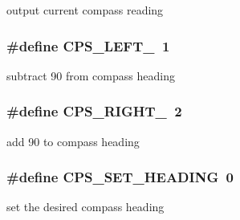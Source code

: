 output current compass reading \hypertarget{group__compass__commands_gab51c4d4e21701c7cd0230a24c2ab74be}{
\subsubsection[{C\-P\-S\-\_\-\-L\-E\-F\-T\-\_\-90}]{\setlength{\rightskip}{0pt plus 5cm}\#define C\-P\-S\-\_\-\-L\-E\-F\-T\-\_~1}}\label{group__compass__commands_gab51c4d4e21701c7cd0230a24c2ab74be}
subtract 90 from compass heading \hypertarget{group__compass__commands_ga53ccdcb9ce75af6b95e56476367d2875}{
\subsubsection[{C\-P\-S\-\_\-\-R\-I\-G\-H\-T\-\_\-90}]{\setlength{\rightskip}{0pt plus 5cm}\#define C\-P\-S\-\_\-\-R\-I\-G\-H\-T\-\_~2}}\label{group__compass__commands_ga53ccdcb9ce75af6b95e56476367d2875}
add 90 to compass heading \hypertarget{group__compass__commands_ga10dbf50964cb04b6648e3b65502c0ff4}{
\subsubsection[{C\-P\-S\-\_\-\-S\-E\-T\-\_\-\-H\-E\-A\-D\-I\-N\-G}]{\setlength{\rightskip}{0pt plus 5cm}\#define C\-P\-S\-\_\-\-S\-E\-T\-\_\-\-H\-E\-A\-D\-I\-N\-G~0}}\label{group__compass__commands_ga10dbf50964cb04b6648e3b65502c0ff4}
set the desired compass heading 